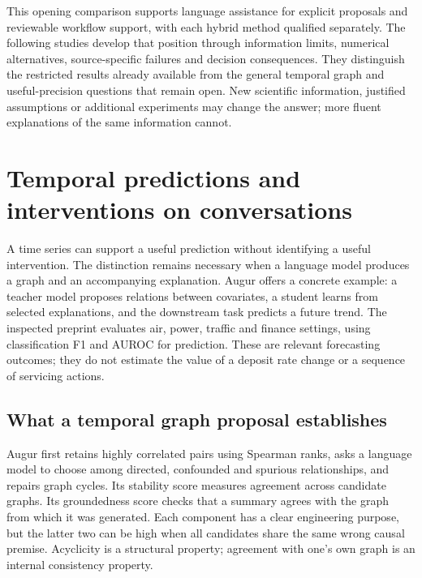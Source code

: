 This opening comparison supports language assistance for explicit proposals
and reviewable workflow support, with each hybrid method qualified separately.
The following studies develop that position through information limits,
numerical alternatives, source-specific failures and decision consequences.
They distinguish the restricted results already available from the general
temporal graph and useful-precision questions that remain open. New scientific
information, justified assumptions or additional experiments may change the
answer; more fluent explanations of the same information cannot.


\hypertarget{temporal-predictions-and-interventions-on-conversations}{%
\section{Temporal predictions and interventions on
conversations}\label{temporal-predictions-and-interventions-on-conversations}}

\label{exec13:census-temporal}

A time series can support a useful prediction without identifying a
useful intervention. The distinction remains necessary when a language
model produces a graph and an accompanying explanation. Augur offers a
concrete example: a teacher model proposes relations between covariates,
a student learns from selected explanations, and the downstream task
predicts a future trend. The inspected preprint evaluates air, power,
traffic and finance settings, using classification F1 and AUROC for
prediction. These are relevant forecasting outcomes; they do not
estimate the value of a deposit rate change or a sequence of servicing
actions. \citep{exec13_census_augur_arxiv}

\hypertarget{what-a-temporal-graph-proposal-establishes}{%
\subsection{What a temporal graph proposal
establishes}\label{what-a-temporal-graph-proposal-establishes}}

Augur first retains highly correlated pairs using Spearman ranks, asks a
language model to choose among directed, confounded and spurious
relationships, and repairs graph cycles. Its stability score measures
agreement across candidate graphs. Its groundedness score checks that a
summary agrees with the graph from which it was generated. Each
component has a clear engineering purpose, but the latter two can be
high when all candidates share the same wrong causal premise. Acyclicity
is a structural property; agreement with one's own graph is an internal
consistency property. \citep{exec13_census_augur_arxiv}

